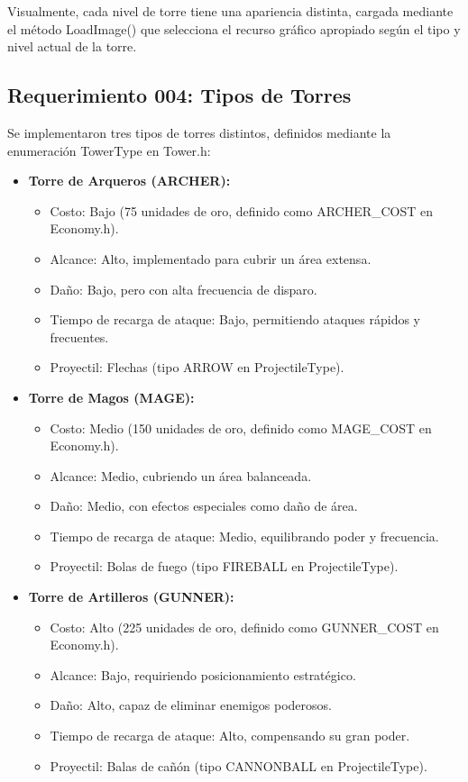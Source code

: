 \documentclass[a4paper,num-refs]{oup-contemporary}
\begin{document}
Visualmente, cada nivel de torre tiene una apariencia distinta, cargada mediante el método LoadImage() que selecciona el recurso gráfico apropiado según el tipo y nivel actual de la torre.

\subsection{Requerimiento 004: Tipos de Torres}
Se implementaron tres tipos de torres distintos, definidos mediante la enumeración TowerType en Tower.h:

\begin{itemize}
    \item \textbf{Torre de Arqueros (ARCHER):}
    \begin{itemize}
        \item Costo: Bajo (75 unidades de oro, definido como ARCHER\_COST en Economy.h).
        \item Alcance: Alto, implementado para cubrir un área extensa.
        \item Daño: Bajo, pero con alta frecuencia de disparo.
        \item Tiempo de recarga de ataque: Bajo, permitiendo ataques rápidos y frecuentes.
        \item Proyectil: Flechas (tipo ARROW en ProjectileType).
    \end{itemize}
    \item \textbf{Torre de Magos (MAGE):}
    \begin{itemize}
        \item Costo: Medio (150 unidades de oro, definido como MAGE\_COST en Economy.h).
        \item Alcance: Medio, cubriendo un área balanceada.
        \item Daño: Medio, con efectos especiales como daño de área.
        \item Tiempo de recarga de ataque: Medio, equilibrando poder y frecuencia.
        \item Proyectil: Bolas de fuego (tipo FIREBALL en ProjectileType).
    \end{itemize}
    \item \textbf{Torre de Artilleros (GUNNER):}
    \begin{itemize}
        \item Costo: Alto (225 unidades de oro, definido como GUNNER_COST en Economy.h).
        \item Alcance: Bajo, requiriendo posicionamiento estratégico.
        \item Daño: Alto, capaz de eliminar enemigos poderosos.
        \item Tiempo de recarga de ataque: Alto, compensando su gran poder.
        \item Proyectil: Balas de cañón (tipo CANNONBALL en ProjectileType).
    \end{itemize}
\end{itemize}
\end{document}
